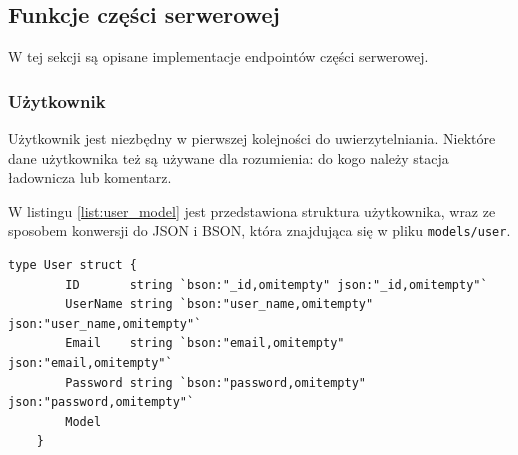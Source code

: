 % 
\subsection{Funkcje części serwerowej}
W tej sekcji są opisane implementacje endpointów części serwerowej.
% 
\subsubsection{Użytkownik}
Użytkownik jest niezbędny w pierwszej kolejności do uwierzytelniania. Niektóre dane użytkownika też są używane dla rozumienia: do kogo należy stacja ładownicza lub komentarz.

W listingu \ref{list:user_model} jest przedstawiona struktura użytkownika, wraz ze sposobem konwersji do JSON i BSON, która znajdująca się w pliku \texttt{models/user}.
\begin{lstlisting}[label=list:user_model,caption=Model danych użytkownika,basicstyle=\tiny\ttfamily]
    type User struct {
        ID       string `bson:"_id,omitempty" json:"_id,omitempty"`
        UserName string `bson:"user_name,omitempty" json:"user_name,omitempty"`
        Email    string `bson:"email,omitempty" json:"email,omitempty"`
        Password string `bson:"password,omitempty" json:"password,omitempty"`
        Model
    }
\end{lstlisting}

% 

